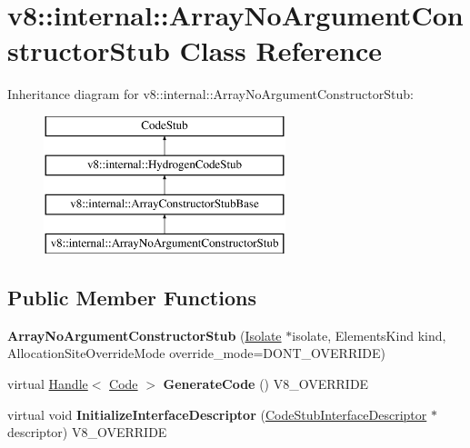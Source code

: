 \hypertarget{classv8_1_1internal_1_1_array_no_argument_constructor_stub}{}\section{v8\+:\+:internal\+:\+:Array\+No\+Argument\+Constructor\+Stub Class Reference}
\label{classv8_1_1internal_1_1_array_no_argument_constructor_stub}
Inheritance diagram for v8\+:\+:internal\+:\+:Array\+No\+Argument\+Constructor\+Stub\+:\begin{figure}[H]
\begin{center}
\leavevmode
\includegraphics[height=4.000000cm]{classv8_1_1internal_1_1_array_no_argument_constructor_stub}
\end{center}
\end{figure}
\subsection*{Public Member Functions}
\begin{DoxyCompactItemize}
\item 
\hypertarget{classv8_1_1internal_1_1_array_no_argument_constructor_stub_a4b397b510eb1fa18711048d7ffb4b2ca}{}{\bfseries Array\+No\+Argument\+Constructor\+Stub} (\hyperlink{classv8_1_1internal_1_1_isolate}{Isolate} $\ast$isolate, Elements\+Kind kind, Allocation\+Site\+Override\+Mode override\+\_\+mode=D\+O\+N\+T\+\_\+\+O\+V\+E\+R\+R\+I\+D\+E)\label{classv8_1_1internal_1_1_array_no_argument_constructor_stub_a4b397b510eb1fa18711048d7ffb4b2ca}

\item 
\hypertarget{classv8_1_1internal_1_1_array_no_argument_constructor_stub_a94a42fc3f23a48e607a9a2f4948db761}{}virtual \hyperlink{classv8_1_1internal_1_1_handle}{Handle}$<$ \hyperlink{classv8_1_1internal_1_1_code}{Code} $>$ {\bfseries Generate\+Code} () V8\+\_\+\+O\+V\+E\+R\+R\+I\+D\+E\label{classv8_1_1internal_1_1_array_no_argument_constructor_stub_a94a42fc3f23a48e607a9a2f4948db761}

\item 
\hypertarget{classv8_1_1internal_1_1_array_no_argument_constructor_stub_a6ba9b3916d4f8c1b492c9eed29388872}{}virtual void {\bfseries Initialize\+Interface\+Descriptor} (\hyperlink{classv8_1_1internal_1_1_code_stub_interface_descriptor}{Code\+Stub\+Interface\+Descriptor} $\ast$descriptor) V8\+\_\+\+O\+V\+E\+R\+R\+I\+D\+E\label{classv8_1_1internal_1_1_array_no_argument_constructor_stub_a6ba9b3916d4f8c1b492c9eed29388872}

\end{DoxyCompactItemize}
